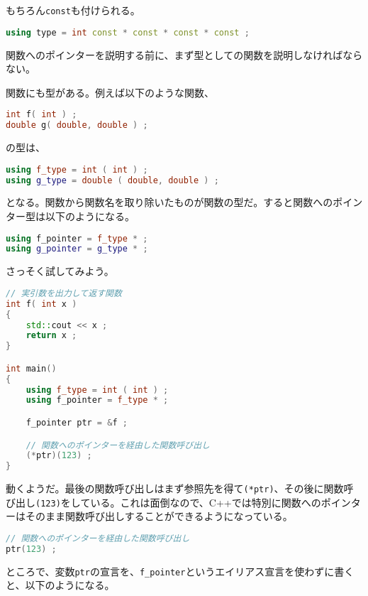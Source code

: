 もちろん\texttt{const}も付けられる。

\begin{lstlisting}[language={C++}]
using type = int const * const * const * const ;
\end{lstlisting}

\clearpage
{}

関数へのポインターを説明する前に、まず型としての関数を説明しなければならない。

関数にも型がある。例えば以下のような関数、
\begin{lstlisting}[language={C++}]
int f( int ) ;
double g( double, double ) ;
\end{lstlisting}
の型は、
\begin{lstlisting}[language={C++}]
using f_type = int ( int ) ;
using g_type = double ( double, double ) ;
\end{lstlisting}
となる。関数から関数名を取り除いたものが関数の型だ。すると関数へのポインター型は以下のようになる。

\begin{lstlisting}[language={C++}]
using f_pointer = f_type * ;
using g_pointer = g_type * ;
\end{lstlisting}

さっそく試してみよう。

\begin{lstlisting}[language={C++}]
// 実引数を出力して返す関数
int f( int x )
{
    std::cout << x ;
    return x ;
}

int main()
{
    using f_type = int ( int ) ;
    using f_pointer = f_type * ;

    f_pointer ptr = &f ;

    // 関数へのポインターを経由した関数呼び出し
    (*ptr)(123) ;
}
\end{lstlisting}

動くようだ。最後の関数呼び出しはまず参照先を得て\texttt{(*ptr)}、その後に関数呼び出し\texttt{(123)}をしている。これは面倒なので、C++では特別に関数へのポインターはそのまま関数呼び出しすることができるようになっている。

\ifTombow\pagebreak\fi
\begin{lstlisting}[language={C++}]
// 関数へのポインターを経由した関数呼び出し
ptr(123) ;
\end{lstlisting}

ところで、変数\texttt{ptr}の宣言を、\texttt{f\_pointer}というエイリアス宣言を使わずに書くと、以下のようになる。

